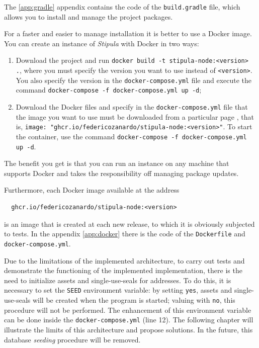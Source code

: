 The \ref{app:gradle} appendix contains the code of the \verb|build.gradle| file, which allows you to 
install and manage the project packages.

For a faster and easier to manage installation it is better to use a Docker image. You can create an 
instance of \textit{Stipula} with Docker in two ways:
\begin{enumerate}
  \item Download the project and run \verb|docker build -t stipula-node:<version> .|, where you must 
  specify the version you want to use instead of \verb|<version>|. You also specify the version in the 
  \verb|docker-compose.yml| file and execute the command \verb|docker-compose -f docker-compose.yml up -d|;
  \item Download the Docker files and specify in the \verb|docker-compose.yml| file that the image you 
  want to use must be downloaded from a particular page \autocite{site:stipula-github-available-packages}, 
  that is, \verb|image: "ghcr.io/federicozanardo/stipula-node:<version>"|. To start the container, use 
  the command \verb|docker-compose -f docker-compose.yml up -d|.
\end{enumerate}

The benefit you get is that you can run an instance on any machine that supports Docker and takes the 
responsibility off managing package updates.

Furthermore, each Docker image available at the address 
\begin{Verbatim}
  ghcr.io/federicozanardo/stipula-node:<version>
\end{Verbatim}
is an image that is created at each new release, to which it is obviously subjected to tests. In the 
appendix \ref{app:docker} there is the code of the \verb|Dockerfile| and \verb|docker-compose.yml|.

\label{database-seeding}
Due to the limitations of the implemented architecture, to carry out tests and demonstrate the 
functioning of the implemented implementation, there is the need to initialize assets and 
single-use-seals for addresses. To do this, it is necessary to set the \verb|SEED| environment variable: 
by setting \verb|yes|, assets and single-use-seals will be created when the program is started; valuing 
with \verb|no|, this procedure will not be performed. The enhancement of this environment variable can be 
done inside the \verb|docker-compose.yml| (line 12). The following chapter will illustrate the limits of 
this architecture and propose solutions. In the future, this database \textit{seeding} procedure will be 
removed.

